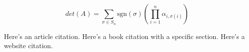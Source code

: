 \documentclass[11pt, reqno]{amsart}
\theoremstyle{plain}
\theoremstyle{definition}
\theoremstyle{example}
\begin{document}
\[det(A) = \sum_{\sigma \in S_n}\text{sgn}(\sigma)\left(\prod_{i=1}^n \alpha_{i, \sigma(i)}\right)\]

Here's an article citation. \cite{vershik}
Here's a book citation with a specific section. \cite[\S 1.1]{riehl}
Here's a website citation. \cite{wiki-tensor}

\printbibliography


\end{document}
